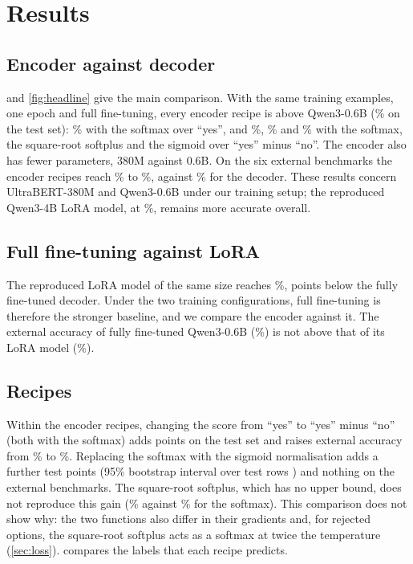 \section{Results}
\label{sec:results}

\subsection{Encoder against decoder}

 and \cref{fig:headline} give the main comparison.
With the same training examples, one epoch and full fine-tuning, every encoder recipe is above Qwen3-0.6B (\TestQwFull{}\% on the test set): \TestUbList{}\% with the softmax over ``yes'', and \TestUbYesNo{}\%, \TestUbSqrt{}\% and \TestUbSig{}\% with the softmax, the square-root softplus and the sigmoid over ``yes'' minus ``no''.
The encoder also has fewer parameters, 380M against 0.6B.
On the six external benchmarks the encoder recipes reach \ExtUbList{}\% to \ExtUbYesNo{}\%, against \ExtQwFull{}\% for the decoder.
These results concern UltraBERT-380M and Qwen3-0.6B under our training setup; the reproduced Qwen3-4B LoRA model, at \TestQwFourLora{}\%, remains more accurate overall.

\subsection{Full fine-tuning against LoRA}

The reproduced LoRA model of the same size reaches \TestQwLora{}\%, \DiffQwFullQwLoraAbs{} points below the fully fine-tuned decoder.
Under the two training configurations, full fine-tuning is therefore the stronger baseline, and we compare the encoder against it.
The external accuracy of fully fine-tuned Qwen3-0.6B (\ExtQwFull{}\%) is not above that of its LoRA model (\ExtQwLora{}\%).

\subsection{Recipes}

Within the encoder recipes, changing the score from ``yes'' to ``yes'' minus ``no'' (both with the softmax) adds \DiffUbYesNoUbListAbs{} points on the test set and raises external accuracy from \ExtUbList{}\% to \ExtUbYesNo{}\%.
Replacing the softmax with the sigmoid normalisation adds a further \DiffUbSigUbYesNoAbs{} test points (95\% bootstrap interval over test rows \DiffUbSigUbYesNoCI{}) and nothing on the external benchmarks.
The square-root softplus, which has no upper bound, does not reproduce this gain (\TestUbSqrt{}\% against \TestUbYesNo{}\% for the softmax).
This comparison does not show why: the two functions also differ in their gradients and, for rejected options, the square-root softplus acts as a softmax at twice the temperature (\cref{sec:loss}).
 compares the labels that each recipe predicts.

